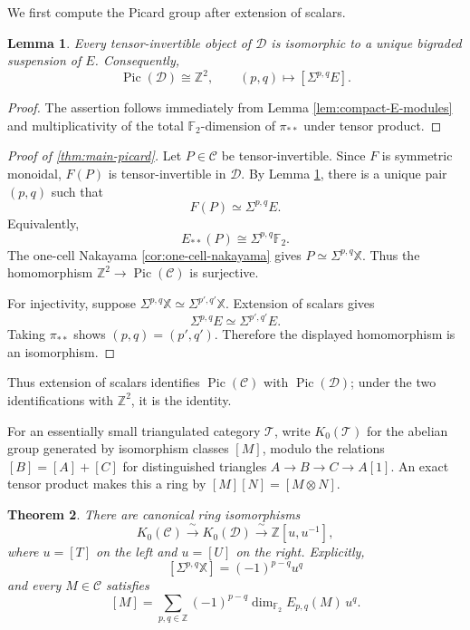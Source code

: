 \documentclass[11pt]{amsart}
\numberwithin{equation}{section}
\newtheorem{theorem}{Theorem}[section]
\newtheorem{lemma}[theorem]{Lemma}
\theoremstyle{definition}
\theoremstyle{remark}
\DeclareMathOperator{\Pic}{Pic}
\newcommand{\F}{\mathbb F_2}
\newcommand{\X}{\mathbb X}
\newcommand{\C}{\mathcal C}
\newcommand{\D}{\mathcal D}
\begin{document}
We first compute the Picard group after extension of scalars.

\begin{lemma}
\label{lem:E-picard}
Every tensor-invertible object of $\D$ is isomorphic to a unique bigraded
suspension of $E$.  Consequently,
\[
  \Pic(\D)\cong\mathbb Z^2,
  \qquad
  (p,q)\longmapsto[\Sigma^{p,q}E].
\]
\end{lemma}

\begin{proof}
The assertion follows immediately from Lemma \ref{lem:compact-E-modules} and multiplicativity of the total $\F$-dimension of $\pi_{**}$ under tensor product.
\end{proof}

\begin{proof}[Proof of \cref{thm:main-picard}]
Let $P\in\C$ be tensor-invertible.  Since $F$ is symmetric monoidal, $F(P)$
is tensor-invertible in $\D$.  By Lemma \ref{lem:E-picard}, there is a unique
pair $(p,q)$ such that
\[
  F(P)\simeq\Sigma^{p,q}E.
\]
Equivalently,
\[
  E_{**}(P)\cong\Sigma^{p,q}\F.
\]
The one-cell Nakayama \ref{cor:one-cell-nakayama} gives
$P\simeq\Sigma^{p,q}\X.$
Thus the homomorphism $\mathbb Z^2\to\Pic(\C)$ is surjective.

For injectivity, suppose
$\Sigma^{p,q}\X\simeq\Sigma^{p',q'}\X$.  Extension of scalars gives
\[
  \Sigma^{p,q}E\simeq\Sigma^{p',q'}E.
\]
Taking $\pi_{**}$ shows $(p,q)=(p',q')$.  Therefore the displayed
homomorphism is an isomorphism.
\end{proof}

Thus extension of scalars identifies $\Pic(\C)$ with $\Pic(\D)$; under the
two identifications with $\mathbb Z^2$, it is the identity.

For an essentially small triangulated category $\mathcal T$, write
$K_0(\mathcal T)$ for the abelian group generated by isomorphism classes
$[M]$, modulo the relations $[B]=[A]+[C]$ for distinguished triangles
$A\to B\to C\to A[1]$.  An exact tensor product makes this a ring by
$[M][N]=[M\otimes N]$.

\begin{theorem}
\label{thm:K0}
There are canonical ring isomorphisms
\[
  K_0(\C)\xrightarrow{\;\sim\;}K_0(\D)
  \xrightarrow{\;\sim\;}\mathbb Z[u,u^{-1}],
\]
where $u=[T]$ on the left and $u=[U]$ on the right.  Explicitly,
\[
  [\Sigma^{p,q}\X]=(-1)^{p-q}u^q
\]
and every $M\in\C$ satisfies
\begin{equation}\label{eq:K0-Euler}
  [M]=\sum_{p,q\in\mathbb Z}
  (-1)^{p-q}\dim_{\F}E_{p,q}(M)\,u^q.
\end{equation}

\end{theorem}
\end{document}
